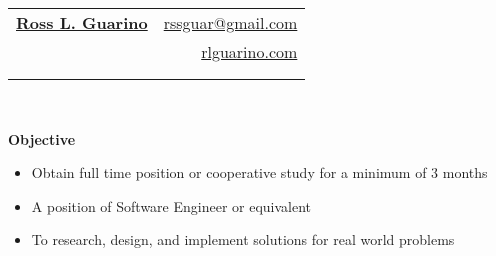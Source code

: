 \documentclass[letterpaper,11pt]{article}
\newcommand{\resheading}[1]{{\large \colorbox{mygrey}{\begin{minipage}{\textwidth}{\textbf{#1 \vphantom{p\^{E}}}}\end{minipage}}}}
\begin{document}
 

\thispagestyle{empty}
\pagestyle{empty}

\newcommand{\mywebheader}{
\begin{tabular*}{7in}{l@{\extracolsep{\fill}}r} \\
  \textbf{\href{http://www.rlguarino.com/}{\large Ross L. Guarino}} & \href{mailto:rlguarino@gmail.com}{rssguar@gmail.com}\\ &
  \href{http://rlguarino.com/}{rlguarino.com} \\ \vspace{-10mm} \\
  {} & \\
  \end{tabular*}
\\
\vspace{0.1in}}

\mywebheader

\resheading{Objective}
{
  \begin{itemize}
  \setlength\itemsep{0em}
    \footnotesize
    \item{Obtain full time position or cooperative study for a minimum of 3 months}
    \item{A position of Software Engineer or equivalent}
    \item{To research, design, and implement solutions for real world problems}
  \end{itemize}
}

\end{document}
